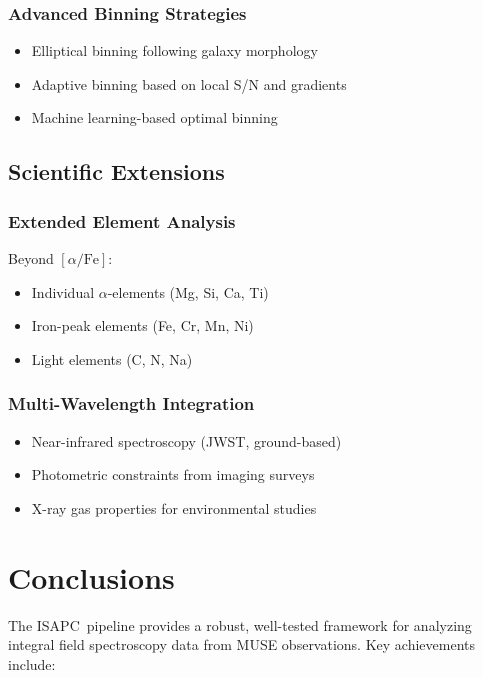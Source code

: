 \documentclass[12pt,a4paper]{article}
\newcommand{\alphaFe}{[\alpha/\text{Fe}]}
\newcommand{\ISAPC}{\textsc{ISAPC}}
\begin{document}
\subsubsection{Advanced Binning Strategies}
\begin{itemize}
    \item Elliptical binning following galaxy morphology
    \item Adaptive binning based on local S/N and gradients
    \item Machine learning-based optimal binning
\end{itemize}

\subsection{Scientific Extensions}

\subsubsection{Extended Element Analysis}
Beyond $\alphaFe$:
\begin{itemize}
    \item Individual $\alpha$-elements (Mg, Si, Ca, Ti)
    \item Iron-peak elements (Fe, Cr, Mn, Ni)
    \item Light elements (C, N, Na)
\end{itemize}

\subsubsection{Multi-Wavelength Integration}
\begin{itemize}
    \item Near-infrared spectroscopy (JWST, ground-based)
    \item Photometric constraints from imaging surveys
    \item X-ray gas properties for environmental studies
\end{itemize}

\section{Conclusions}

The \ISAPC\ pipeline provides a robust, well-tested framework for analyzing integral field spectroscopy data from MUSE observations. Key achievements include:
\end{document}
